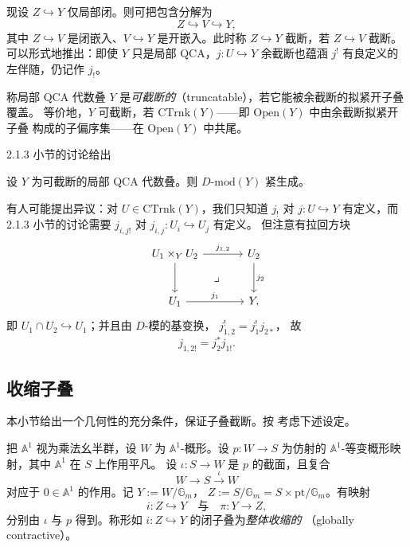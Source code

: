 现设 $Z\hookrightarrow Y$ 仅局部闭。则可把包含分解为
\[
Z\hookrightarrow V\hookrightarrow Y,
\]
其中 $Z\hookrightarrow V$ 是闭嵌入、$V\hookrightarrow Y$ 是开嵌入。此时称
$Z\hookrightarrow Y$ 截断，若 $Z\hookrightarrow V$ 截断。
可以形式地推出：即使 $Y$ 只是局部 QCA，$j\colon U\hookrightarrow Y$ 余截断也蕴涵
$j^{!}$ 有良定义的左伴随，仍记作 $j_{!}$。
\begin{definition}[{[DG15, 定义 4.1.1]}]
\label{def:truncatable}
称局部 QCA 代数叠 $Y$ 是\emph{可截断的}（truncatable），若它能被余截断的拟紧开子叠覆盖。
等价地，$Y$ 可截断，若 $\mathrm{CTrnk}(Y)$——即 $\mathrm{Open}(Y)$ 中由余截断拟紧开子叠
构成的子偏序集——在 $\mathrm{Open}(Y)$ 中共尾。
\end{definition}
2.1.3 小节的讨论给出

\begin{proposition}
\label{prop:truncatable}
设 $Y$ 为可截断的局部 QCA 代数叠。则 $D\text{-}\mathrm{mod}(Y)$ 紧生成。
\end{proposition}

有人可能提出异议：对 $U\in \mathrm{CTrnk}(Y)$，我们只知道 $j_{!}$ 对 $j\colon U\hookrightarrow Y$
有定义，而 2.1.3 小节的讨论需要 $j_{i,j!}$ 对 $j_{i,j}\colon U_i\hookrightarrow U_j$ 有定义。
但注意有拉回方块
\[
\begin{tikzcd}[column sep=large,row sep=large]
U_1\times_Y U_2 \arrow[r,"j_{1,2}"] \arrow[d] \arrow[dr,phantom,"\lrcorner" description] & U_2 \arrow[d,"j_2"]\\
U_1 \arrow[r,"j_1"] & Y,
\end{tikzcd}
\]
即 $U_1\cap U_2\hookrightarrow U_1$；并且由 $D$-模的基变换，
$
j^{!}_{1,2}=j^{!}_{1}j_{2*}$，
故
\[
j_{1,2!}=j_{2}^{*}j_{1!}.
\]

\subsection{收缩子叠}
\label{sec:contractive}

本小节给出一个几何性的充分条件，保证子叠截断。按 \cite[5.1.1]{DG15} 考虑下述设定。

\begin{definition}
\label{def:globally-contractive}
把 $\mathbb{A}^1$ 视为乘法幺半群，设 $W$ 为 $\mathbb{A}^1$-概形。设
$p\colon W\to S$ 为仿射的 $\mathbb{A}^1$-等变概形映射，其中 $\mathbb{A}^1$ 在 $S$ 上作用平凡。
设 $\iota\colon S\to W$ 是 $p$ 的截面，且复合
\[
W\to S\xrightarrow{\ \iota\ }W
\]
对应于 $0\in \mathbb{A}^1$ 的作用。记 $Y:=W/\mathbb{G}_m$，
$Z:=S/\mathbb{G}_m=S\times \mathrm{pt}/\mathbb{G}_m$。有映射
\[
i\colon Z\hookrightarrow Y
\quad\text{与}\quad
\pi\colon Y\to Z,
\]
分别由 $\iota$ 与 $p$ 得到。称形如 $i\colon Z\hookrightarrow Y$ 的闭子叠为\emph{整体收缩的}
（globally contractive）。
\end{definition}

